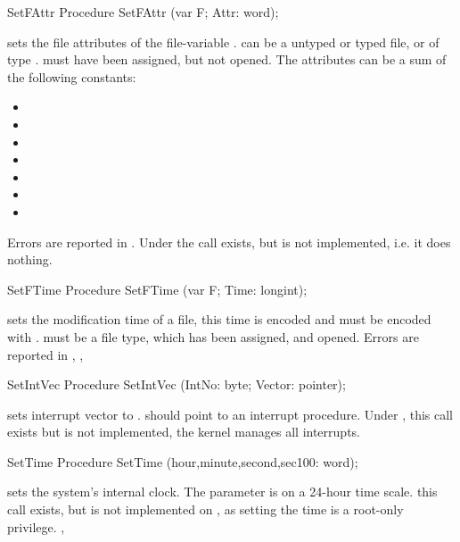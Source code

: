 \begin{procedure}{SetFAttr}
\Declaration
Procedure SetFAttr (var F; Attr: word);

\Description

 sets the file attributes of the file-variable .
  can be a untyped or typed file, or of type .  must
have been assigned, but not opened. The attributes can be a sum of the
following constants:
\begin{itemize}
\item {}
\item {}
\item {}
\item {}
\item {}
\item {}
\item {}
\end{itemize}

\Errors
Errors are reported in .
Under \linux the call exists, but is not implemented, i.e. it does nothing.
\SeeAlso
{}
\end{procedure}
\begin{procedure}{SetFTime}
\Declaration
Procedure SetFTime (var F; Time: longint);

\Description

 sets the modification time of a file,
this time is encoded and must be encoded with . 
 must be a file type, which has been assigned, and
opened.
\Errors
Errors are reported in 
\SeeAlso
{}, ,
\end{procedure}
\begin{procedure}{SetIntVec}
\Declaration
Procedure SetIntVec (IntNo: byte; Vector: pointer);

\Description

 sets interrupt vector  to .
 should point to an interrupt procedure.
\Errors
Under \linux, this
call exists but is not implemented, the kernel manages all interrupts.
\SeeAlso
{}
\end{procedure}
\begin{procedure}{SetTime}
\Declaration
Procedure SetTime (hour,minute,second,sec100: word);

\Description

 sets the system's internal clock. The  parameter is
on a 24-hour time scale.
\Errors
this call exists, but is not implemented on \linux, 
as setting the time is a root-only privilege.
\SeeAlso
{}, 
\end{procedure}
